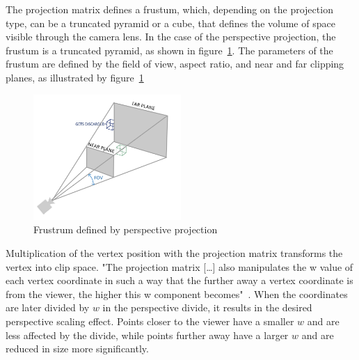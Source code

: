 
The projection matrix defines a frustum, which, depending on the projection type, can be a truncated pyramid or a cube,
that defines the volume of space visible through the camera lens.
In the case of the perspective projection, the frustum is a truncated pyramid, as shown in figure~\ref{fig:perspective}.
The parameters of the frustum are defined by the field of view, aspect ratio, and near and far clipping planes,
as illustrated by figure~\ref{fig:perspective}
\begin{figure}[h]
    \centering
    \includegraphics[width=0.50\textwidth]{images/perspective}
    \caption{Frustrum defined by perspective projection}
    \label{fig:perspective}
\end{figure}
Multiplication of the vertex position with the projection matrix transforms the vertex into clip space.
"The projection matrix [\ldots] also manipulates the w value of each vertex coordinate in such a way
that the further away a vertex coordinate is from the viewer, the higher this w component becomes"~\parencite{de_vries_learn_2020}.
When the coordinates are later divided by $w$ in the perspective divide,
it results in the desired perspective scaling effect.
Points closer to the viewer have a smaller $w$ and are less affected by the divide,
while points further away have a larger $w$ and are reduced in size more significantly.



